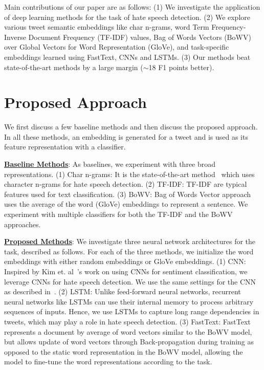 \documentclass[letterpaper]{sig-alternate-2013}
\begin{document}
Main contributions of our paper are as follows: (1) We investigate the application of deep learning methods for the task of hate speech detection. (2) We explore various tweet semantic embeddings like char n-grams, word Term Frequency-Inverse Document Frequency (TF-IDF) values, Bag of Words Vectors (BoWV) over Global Vectors for Word Representation (GloVe), and task-specific embeddings learned using FastText, CNNs and LSTMs. (3) Our methods beat state-of-the-art methods by a large margin ($\sim$18 F1 points better).

\section{Proposed Approach}
We first discuss a few baseline methods and then discuss the proposed approach. In all these methods, an embedding is generated for a tweet and is used as its feature representation with a classifier.

\noindent\underline{\textbf{Baseline Methods}}: As baselines, we experiment with three broad representations. (1) Char n-grams: It is the state-of-the-art method~\cite{waseem2016hateful} which uses character n-grams for hate speech detection. (2) TF-IDF: TF-IDF are typical features used for text classification. (3) BoWV: Bag of Words Vector approach uses the average of the word (GloVe) embeddings to represent a sentence. We experiment with multiple classifiers for both the TF-IDF and the BoWV approaches.

\noindent\underline{\textbf{Proposed Methods}}: We investigate three neural network architectures for the task, described as follows. For each of the three methods, we initialize the word embeddings with either random embeddings or GloVe embeddings. (1) CNN: Inspired by Kim et. al~\cite{Kim14}'s work on using CNNs for sentiment classification, we leverage CNNs for hate speech detection. We use the same settings for the CNN as described in~\cite{Kim14}. (2) LSTM: Unlike feed-forward neural networks, recurrent neural networks like LSTMs can use their internal memory to process arbitrary sequences of inputs. Hence, we use LSTMs to capture long range dependencies in tweets, which may play a role in hate speech detection. (3) FastText: FastText~\cite{joulin2016bag} represents a document by average of word vectors similar to the BoWV model, but allows update of word vectors through Back-propagation during training as opposed to the static word representation in the BoWV model, allowing the model to fine-tune the word representations according to the task.
\end{document}
